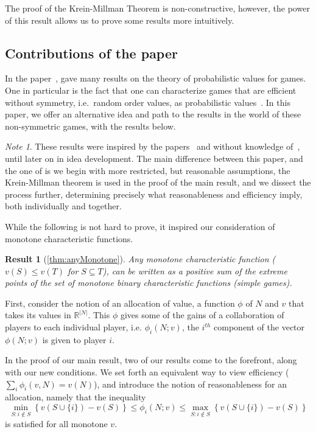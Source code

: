 \documentclass[12pt,letterpaper,final]{article}
\theoremstyle{plain}
\theoremstyle{plain}
\theoremstyle{plain}
\theoremstyle{plain}
\theoremstyle{plain}
\theoremstyle{plain}
\theoremstyle{plain}
\newtheorem{result}{Result}
\theoremstyle{definition}
\theoremstyle{definition}
\theoremstyle{definition}
\theoremstyle{definition}
\theoremstyle{definition}
\theoremstyle{remark}
\theoremstyle{remark}
\newtheorem*{note}{Note}
\theoremstyle{remark}
\theoremstyle{remark}
\begin{document}
The proof of the Krein-Millman Theorem is non-constructive,
however, the power of this result allows us to prove some results more
intuitively.

\subsection{Contributions of the paper}

In the paper~\cite{Weber78}, \citeauthor{Weber78} gave many results on
the theory of probabilistic values for games. One in particular is the
fact that one can characterize games that are efficient without
symmetry, i.e.\ random order values, as probabilistic
values~\cite[Theorems 12 and 13]{Weber78}. In this
paper, we offer an alternative idea and path to the results in
the world of these non-symmetric games, with the results below.

\begin{note}
  These results were inspired by the papers~\cite{Owen72,Shapley53}
  and without knowledge of~\cite{Weber78}, until later on in idea
  development. The main difference between this paper, and the one of
  \citeauthor{Weber78} is we begin with more restricted, but
  reasonable assumptions, the Krein-Millman theorem is used
  in the proof of the main result, and
  we dissect the process further, determining precisely what
  reasonableness and efficiency imply, both individually and together.
\end{note}

While the following is not hard to prove, it inspired our
consideration of monotone characteristic functions.
\begin{result}[\cref{thm:anyMonotone}]
  Any monotone characteristic function (\(v(S) \leq v(T)\) for
  \(S\subseteq T\)), can be written as a positive 
  sum of the extreme points of the set of monotone binary
  characteristic functions (simple games).
\end{result}

First, consider the notion of an allocation of value, a function \(\phi\)
of \(N\) and \(v\) that takes its values in \(\mathbb{R}^{|N|}\). This \(\phi\)
gives some of the gains of a collaboration of players to each individual player,
i.e. \(\phi_i(N;v)\), the \(i^{th}\) component of the vector
\(\phi(N;v)\) is given to player \(i\). 

In the proof of our main result, two of our results come to the
forefront, along with our new conditions. We set forth an equivalent
way to view efficiency (\(\sum_i\phi_i(v,N) = v(N)\)), and introduce
the notion of reasonableness for an allocation, namely that the inequality
\[
  \min_{S: i\notin S}\left\{ v\left(S \cup\{i\}\right) -v(S)\right\}
  \leq \phi_i(N;v) \leq \max_{S: i \notin
    S}\left\{v\left(S \cup \{i\}\right) - v(S)\right\}
\]
is satisfied for all monotone \(v\).
\end{document}
